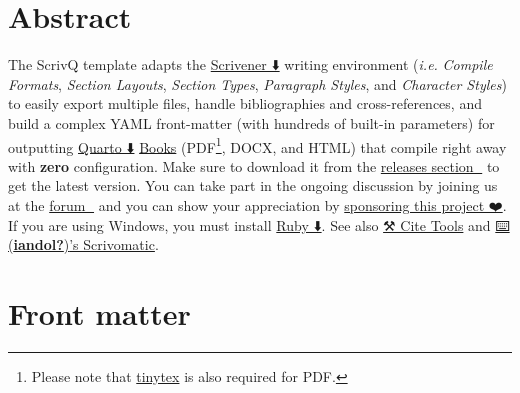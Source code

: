 \documentclass[
  12pt,
  a4paper,
  oneside,
  numbers=noenddot,
  titlepage,
  toclink=all,
  toc=bibliography]{scrbook}
\author{}
\date{}
\renewcommand*\contentsname{Table of contents}
\newcommand\contentsname{Table of contents}
\theoremstyle{definition}
\theoremstyle{definition}
\theoremstyle{definition}
\theoremstyle{plain}
\theoremstyle{plain}
\theoremstyle{plain}
\theoremstyle{plain}
\theoremstyle{plain}
\theoremstyle{remark}
\begin{document}
\frontmatter

\renewcommand*\contentsname{Table of contents}
{
\hypersetup{linkcolor=black}
\setcounter{tocdepth}{2}
\tableofcontents
}
\listoffigures
\listoftables
{}
\mainmatter
\hypertarget{sec-scriv1}{%
\chapter{Abstract}\label{sec-scriv1}}

The ScrivQ template adapts the
\href{https://www.literatureandlatte.com}{Scrivener ⬇️} writing
environment (\emph{i.e.} \emph{Compile Formats}, \emph{Section Layouts},
\emph{Section Types}, \emph{Paragraph Styles}, and \emph{Character
Styles}) to easily export multiple files, handle bibliographies and
cross-references, and build a complex YAML front-matter (with hundreds
of built-in parameters) for outputting
\href{https://quarto.org/docs/get-started/}{Quarto ⬇️}
\href{https://quarto.org/docs/books/}{Books} (PDF\footnote{Please note
  that
  \href{https://quarto.org/docs/output-formats/pdf-engine.html\#installing-tex}{tinytex}
  is also required for PDF.}, DOCX, and HTML) that compile right away
with \textbf{zero} configuration. Make sure to download it from the
\href{https://github.com/bcdavasconcelos/ScrivQ/releases}{releases
section 🚀} to get the latest version. You can take part in the ongoing
discussion by joining us at the
\href{https://forum.literatureandlatte.com/t/scrivq-a-template-to-control-quarto-export-multiple-files-manage-bibliography-and-easily-create-cross-references/134755}{forum
💬} and you can show your appreciation by
\href{https://github.com/sponsors/bcdavasconcelos}{sponsoring this
project ❤️}. If you are using Windows, you must install
\href{https://www.ruby-lang.org/en/downloads}{Ruby ⬇️}. See also
\href{https://bcdavasconcelos.github.io/citetools}{⚒️ Cite Tools} and
\href{https://github.com/iandol/scrivomatic}{⌨️
\protect\hypertarget{cite_1}{}{\label{cite_1}(\protect\hyperlink{ref-iandol}{\textbf{iandol?}})}'s
Scrivomatic}.

\hypertarget{sec-scriv2}{%
\chapter{Front matter}\label{sec-scriv2}}

\end{document}
